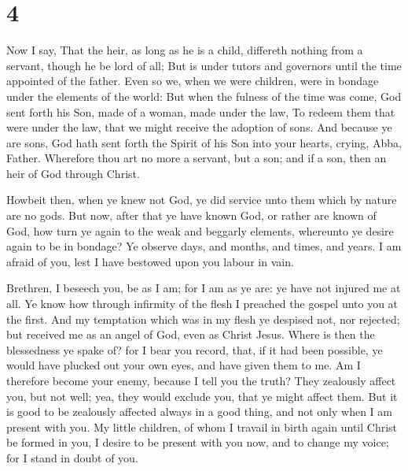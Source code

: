 \hypertarget{section-3}{%
\section{4}\label{section-3}}

 Now I say, That the heir, as long as he is a child,
differeth nothing from a servant, though he be lord of all; 
But is under tutors and governors until the time appointed of the
father.  Even so we, when we were children, were in bondage
under the elements of the world:  But when the fulness of
the time was come, God sent forth his Son, made of a woman, made under
the law,  To redeem them that were under the law, that we
might receive the adoption of sons.  And because ye are
sons, God hath sent forth the Spirit of his Son into your hearts,
crying, Abba, Father.  Wherefore thou art no more a servant,
but a son; and if a son, then an heir of God through Christ.

 Howbeit then, when ye knew not God, ye did service unto
them which by nature are no gods.  But now, after that ye
have known God, or rather are known of God, how turn ye again to the
weak and beggarly elements, whereunto ye desire again to be in bondage?
 Ye observe days, and months, and times, and years.
 I am afraid of you, lest I have bestowed upon you labour
in vain.

 Brethren, I beseech you, be as I am; for I am as ye are:
ye have not injured me at all.  Ye know how through
infirmity of the flesh I preached the gospel unto you at the first.
 And my temptation which was in my flesh ye despised not,
nor rejected; but received me as an angel of God, even as Christ Jesus.
 Where is then the blessedness ye spake of? for I bear you
record, that, if it had been possible, ye would have plucked out your
own eyes, and have given them to me.  Am I therefore become
your enemy, because I tell you the truth?  They zealously
affect you, but not well; yea, they would exclude you, that ye might
affect them.  But it is good to be zealously affected
always in a good thing, and not only when I am present with you.
 My little children, of whom I travail in birth again until
Christ be formed in you,  I desire to be present with you
now, and to change my voice; for I stand in doubt of you.

